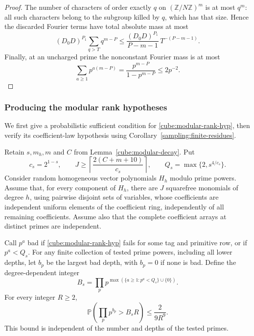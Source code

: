 \begin{proof}
The number of characters of order exactly $q$ on
$(\mathbb Z/N\mathbb Z)^m$ is at most $q^m$: all such characters belong
to the subgroup killed by $q$, which has that size.  Hence the discarded
Fourier terms have total absolute mass at most
\[
 (D_0D)^{P_1}\sum_{q>T}q^{m-P}
 \leq \frac{(D_0D)^{P_1}}{P-m-1}\,T^{-(P-m-1)}.
\]
Finally, at an uncharged prime the nonconstant Fourier mass is at most
\[
 \sum_{a\geq1}p^{a(m-P)}
 =\frac{p^{m-P}}{1-p^{m-P}}\leq2p^{-2}.
\]
\end{proof}

\subsubsection{Producing the modular rank hypotheses}

We first give a probabilistic sufficient condition for
\eqref{cube:modular-rank-hyp}, then verify its coefficient-law
hypothesis using Corollary~\ref{sampling:finite-residues}.

\begin{lemma}
\label{cube:modular-exceptions}
Retain $s,m_h,m$ and $C$ from Lemma~\ref{cube:modular-decay}.  Put
\[
 c_s=2^{1-s},\qquad
 J\geq\left\lceil\frac{2(C+m+10)}{c_s}\right\rceil,
 \qquad Q_s=\max\{2,s^{4/c_s}\}.
\]
Consider random homogeneous vector polynomials $H_h$ modulo prime powers.
Assume that, for every component of $H_h$, there are $J$ squarefree
monomials of degree $h$, using pairwise disjoint sets of variables, whose
coefficients are independent uniform elements of the coefficient ring,
independently of all remaining coefficients.  Assume also that the
complete coefficient arrays at distinct primes are independent.

Call $p^a$ bad if \eqref{cube:modular-rank-hyp} fails for some tag and
primitive row, or if $p^a<Q_s$.  For any finite collection of tested
prime powers, including all lower depths, let $b_p$ be the largest bad
depth, with $b_p=0$ if none is bad.  Define the degree-dependent integer
\[
 B_s=\prod_p p^{\max(\{a\geq1:p^a<Q_s\}\cup\{0\})}.
\]
For every integer $R\geq2$,
\begin{equation}\label{cube:bad-prime-product}
 \mathbb P\left(\prod_p p^{b_p}>B_sR\right)
 \leq \frac{2}{9R^9}.
\end{equation}
This bound is independent of the number and depths of the tested primes.
\end{lemma}

